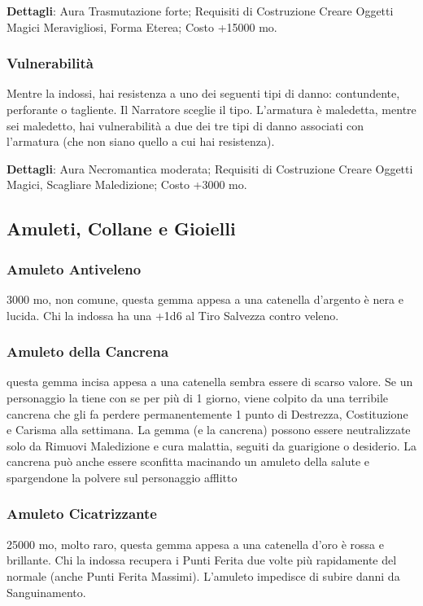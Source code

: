 \begin{multicols}{2}
\textbf{Dettagli}: Aura Trasmutazione forte; Requisiti di Costruzione Creare Oggetti Magici Meravigliosi, Forma Eterea; Costo +15000 mo.

\subsubsection*{Vulnerabilità}

Mentre la indossi, hai resistenza a uno dei seguenti tipi di danno: contundente, perforante o tagliente. Il Narratore sceglie il tipo. L'armatura è maledetta, mentre sei maledetto, hai vulnerabilità a due dei tre tipi di danno associati con l'armatura (che non siano quello a cui hai resistenza).

\textbf{Dettagli}: Aura Necromantica moderata; Requisiti di Costruzione Creare Oggetti Magici, Scagliare Maledizione; Costo +3000 mo.


\subsection{Amuleti, Collane e Gioielli}

\subsubsection*{Amuleto Antiveleno}
3000 mo, non comune, questa gemma appesa a una catenella d’argento è nera e lucida. Chi la indossa ha una +1d6 al Tiro Salvezza contro veleno.

\subsubsection*{Amuleto della Cancrena}
questa gemma incisa appesa a una catenella sembra essere di scarso valore. Se un personaggio la tiene con se per più di 1 giorno, viene colpito da una terribile cancrena che gli fa perdere permanentemente 1 punto di Destrezza, Costituzione e Carisma alla settimana. La gemma (e la cancrena) possono essere neutralizzate solo da Rimuovi Maledizione e cura malattia, seguiti da guarigione o desiderio. La cancrena può anche essere sconfitta macinando un amuleto della salute e spargendone la polvere sul personaggio afflitto

\subsubsection*{Amuleto Cicatrizzante}
25000 mo, molto raro, questa gemma appesa a una catenella d’oro è rossa e brillante. Chi la indossa recupera i Punti Ferita due volte più rapidamente del normale (anche Punti Ferita Massimi). L’amuleto impedisce di subire danni da Sanguinamento.


\end{multicols}
